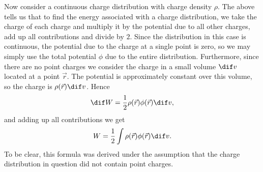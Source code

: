 \documentclass[article, a4paper, 11pt, oneside]{memoir}
\numberwithin{equation}{chapter}
\theoremstyle{nonumberplain}
\begin{document}
Now consider a continuous charge distribution with charge density $\rho$. The above tells us that to find the energy associated with a charge distribution, we take the charge of each charge and multiply it by the potential due to all other charges, add up all contributions and divide by $2$. Since the distribution in this case is continuous, the potential due to the charge at a single point is zero, so we may simply use the total potential $\phi$ due to the entire distribution. Furthermore, since there are no point charges we consider the charge in a small volume $\dif v$ located at a point $\vec{r}$. The potential is approximately constant over this volume, so the charge is $\rho(\vec{r}) \dif v$. Hence
%
\begin{equation*}
    \dif W
        = \frac{1}{2} \rho(\vec{r}) \phi(\vec{r}) \dif v,
\end{equation*}
%
and adding up all contributions we get
%
\begin{equation*}
    W
        = \frac{1}{2} \int \rho(\vec{r}) \phi(\vec{r}) \dif v.
\end{equation*}
%
To be clear, this formula was derived under the assumption that the charge distribution in question did not contain point charges.
\end{document}
